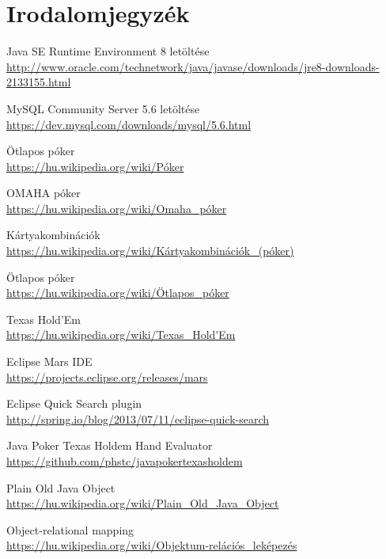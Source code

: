 \part{Irodalomjegyzék}

\begin{thebibliography}{9}

Java SE Runtime Environment 8 letöltése \\
\url{http://www.oracle.com/technetwork/java/javase/downloads/jre8-downloads-2133155.html}

MySQL Community Server 5.6 letöltése \\
\url{https://dev.mysql.com/downloads/mysql/5.6.html}

Ötlapos póker \\
\url{https://hu.wikipedia.org/wiki/Póker}

OMAHA póker \\
\url{https://hu.wikipedia.org/wiki/Omaha_póker}

Kártyakombinációk \\
\url{https://hu.wikipedia.org/wiki/Kártyakombinációk_(póker)}

Ötlapos póker \\
\url{https://hu.wikipedia.org/wiki/Ötlapos_póker}

Texas Hold'Em \\
\url{https://hu.wikipedia.org/wiki/Texas_Hold'Em}

Eclipse Mars IDE \\
\url{https://projects.eclipse.org/releases/mars}

Eclipse Quick Search plugin \\
\url{http://spring.io/blog/2013/07/11/eclipse-quick-search}

Java Poker Texas Holdem Hand Evaluator \\
\url{https://github.com/phstc/javapokertexasholdem}

Plain Old Java Object \\
\url{https://hu.wikipedia.org/wiki/Plain_Old_Java_Object}

Object-relational mapping \\
\url{https://hu.wikipedia.org/wiki/Objektum-relációs_leképezés}




\end{thebibliography}
